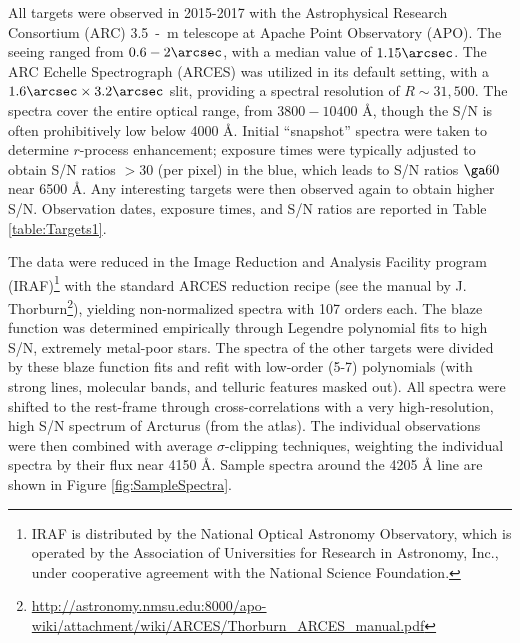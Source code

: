 \documentclass[preprint]{aastex61}
\begin{document}
All targets were observed in 2015-2017 with the Astrophysical Research
Consortium (ARC) 3.5~-~m telescope at Apache Point Observatory (APO).
The seeing ranged from $0.6-2\arcsec$, with a median value of
$1.15\arcsec$.  The ARC Echelle Spectrograph (ARCES) was utilized in
its default setting, with a $1.6\arcsec \times 3.2\arcsec$ slit,
providing a spectral resolution of $R\sim 31,500$.  The spectra cover
the entire optical range, from $3800-10400$ \AA , though the S/N is
often prohibitively low below 4000 \AA.  Initial ``snapshot'' spectra
were taken to determine $r$-process enhancement; exposure times were
typically adjusted to obtain S/N ratios $>30$ (per pixel) in the blue,
which leads to S/N ratios $\ga 60$ near 6500 \AA.  Any interesting
targets were then observed again to obtain higher S/N.  Observation
dates, exposure times, and S/N ratios are reported in Table
\ref{table:Targets1}.

The data were reduced in the Image Reduction and Analysis Facility
program (IRAF)\footnote{IRAF is distributed by the National Optical
  Astronomy Observatory, which is operated by the Association of
  Universities for Research in Astronomy, Inc., under cooperative
  agreement with the National Science Foundation.} with the standard
ARCES reduction recipe (see the manual by
J. Thorburn\footnote{\url{http://astronomy.nmsu.edu:8000/apo-wiki/attachment/wiki/ARCES/Thorburn_ARCES_manual.pdf}}),
yielding non-normalized spectra with 107 orders each.  The blaze
function was determined empirically through Legendre polynomial fits
to high S/N, extremely metal-poor stars.  The spectra of the other
targets were divided by these blaze function fits and refit with
low-order (5-7) polynomials (with strong lines, molecular bands, and
telluric features masked out).  All spectra were shifted to the
rest-frame through cross-correlations with a very high-resolution,
high S/N spectrum of Arcturus (from the \citealt{Hinkle2003}
atlas). The individual observations were then combined with average
$\sigma$-clipping techniques, weighting the individual spectra by
their flux near 4150 \AA.  Sample spectra around the 4205
\AA \hspace{0.02in}  line are shown in Figure
\ref{fig:SampleSpectra}.
\end{document}
